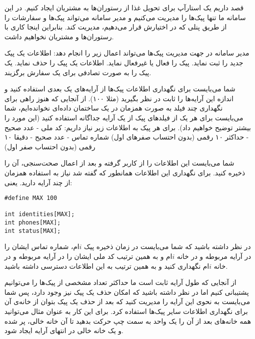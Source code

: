 

قصد داریم یک استارآپ برای تحویل غذا از رستوران‌ها به مشتریان ایجاد کنیم. در این سامانه ما تنها پیک‌ها را مدیریت می‌کنیم و مدیر سامانه می‌تواند پیک‌ها و سفارشات را از طریق پنلی که در اختیارش قرار می‌دهیم، مدیریت کند.
بنابراین اینجا کاری با رستوران‌ها و مشتریان نخواهیم داشت.


مدیر سامانه در جهت مدیریت پیک‌ها می‌تواند اعمال زیر را انجام دهد:
 اطلاعات یک پیک جدید را ثبت نماید.
 پیک را فعال یا غیرفعال نماید.
 اطلاعات یک پیک را حذف نماید.
 یک پیک را به صورت تصادفی برای یک سفارش برگزیند.

شما می‌بایست برای نگهداری اطلاعات پیک‌ها از آرایه‌های یک بعدی استفاده کنید و اندازه این آرایه‌ها را ثابت در نظر بگیرید (مثلا ۱۰۰). از آنجایی که هنوز راهی برای نگهداری چند فیلد به صورت همزمان در یک ساختمان داده‌ای نخوانده‌ایم، شما می‌بایست برای هر یک از فیلدهای پیک از یک آرایه جداگانه استفاده کنید (این مورد را بیشتر توضیح خواهیم داد).
برای هر پیک به اطلاعات زیر نیاز داریم:
 کد ملی - عدد صحیح - حداکثر ۱۰ رقمی (بدون احتساب صفرهای اول)
 شماره تماس - عدد صحیح - دقیقا ۱۰ رقمی (بدون احتساب صفر اول)

شما می‌بایست این اطلاعات را از کاربر گرفته و بعد از اعمال صحت‌سنجی، آن‌ را ذخیره کنید. برای نگهداری این اطلاعات همانطور که گفته شد نیاز به استفاده همزمان از چند آرایه دارید. یعنی:

\begin{latin}
\begin{verbatim}
#define MAX 100

int identities[MAX];
int phones[MAX];
int status[MAX];
\end{verbatim}
\end{latin}

در نظر داشته باشید که شما می‌بایست در زمان ذخیره پیک $i$ام، شماره تماس ایشان را در آرایه مربوطه و در خانه $i$ام و به همین ترتیب کد ملی ایشان را در آرایه مربوطه و در خانه $i$ام نگهداری کنید و به همین ترتیب به این اطلاعات دسترسی داشته باشید.

از آنجایی که طول آرایه ثابت است ما حداکثر تعداد مشخصی از پیک‌ها را می‌توانیم پشتیبانی کنیم اما در نظر داشته باشید که امکان حذف یک پیک نیز وجود دارد، پس شما می‌بایست به نحوی این آرایه را مدیریت کنید که بعد از حذف یک پیک بتوان از خانه‌ی آن برای نگهداری اطلاعات سایر پیک‌ها استفاده کرد.
برای این کار به عنوان مثال می‌توانید همه خانه‌های بعد از آن را یک واحد به سمت چپ حرکت بدهید تا آن خانه خالی، پر شده و یک خانه خالی در انتهای آرایه ایجاد شود.

